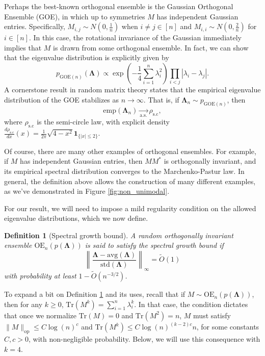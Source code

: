 \documentclass[reqno]{amsart}
\numberwithin{equation}{section}
\newcommand\on[1]{{\mathbf 1}_{\{#1\}}}
\newcommand{\emp}{\mathrm{emp}}
\newtheorem{definition}[theorem]{Definition}
\begin{document}
Perhaps the best-known orthogonal ensemble is the Gaussian Orthogonal Ensemble (GOE), in which up to symmetries $M$ has independent Gaussian entries. Specifically, $M_{i,j} \sim N(0,\frac{1}{n})$ when $i\neq j \in [n]$ and $M_{i,i} \sim N(0, \frac{2}{n})$ for $i \in [n]$. In this case, the rotational invariance of the Gaussian immediately implies that $M$ is drawn from some orthogonal ensemble. In fact, we can show that the eigenvalue distribution is explicitly given by
\begin{equation} \label{eq:GOEeigs}
    p_{\mathrm{GOE}(n)}(\bm{\Lambda}) \propto \exp\left(-\frac{1}{4}\sum\limits_{i=1}^n\lambda_i^2\right) \prod_{i<j} |\lambda_i-\lambda_j|.
\end{equation}
A cornerstone result in random matrix theory states that the empirical eigenvalue distribution of the GOE stabilizes as $n\to \infty$. That is, if $\bm{\Lambda}_n\sim  p_{\mathrm{GOE}(n)}$,
then 
\begin{equation} \label{eq:wigner}
    \emp(\bm{\Lambda}_n) \underset{\mathrm{a.s.}}{\longrightarrow} \rho_{\mathrm{s.c}},
\end{equation}
where $\rho_{\mathrm{s.c}}$ is the semi-circle law, with explicit density
$\frac{d\rho_{\mathrm{s.c}}}{dx}(x) = \frac{1}{2\pi}\sqrt{4-x^2}\on{|x|\leq 2}.$ 

Of course, there are many other examples of orthogonal ensembles. For example, if $M$ has independent Gaussian entries, then $MM^*$ is orthogonally invariant, and its empirical spectral distribution converges to the Marchenko-Pastur law. In general, the definition above allows the construction of many different examples, as we've demonstrated in Figure \ref{fig:non_unimodal}.

For our result, we will need to impose a mild regularity condition on the allowed eigenvalue distributions, which we now define.
\begin{definition}[Spectral growth bound]\label{spec_growth}
A random orthogonally invariant ensemble $\mathrm{OE}_n(p(\bm{\Lambda}))$ is said to satisfy the spectral growth bound if 
\[\left\| \frac{\bm{\Lambda} - \mathrm{avg}(\bm{\Lambda})}{\mathrm{std}(\bm{\Lambda})} \right\|_{\infty} = \tilde O(1)%
\]
with probability at least $1 - \tilde O\left({n^{-3/2}}\right)$.
\end{definition}
To expand a bit on Definition \ref{spec_growth} and its uses, recall that if $M \sim \mathrm{OE}_n(p(\bm{\Lambda}))$, then for any $k \geq 0$, $\mathrm{Tr}(M^k) = \sum\limits_{i=1}^n\lambda_i^k$. In that case, the condition dictates that once we normalize $\mathrm{Tr}(M) = 0$ and $\mathrm{Tr}(M^2) = n$, $M$ must satisfy 
$\|M\|_{\mathrm{op}} \leq C\log(n)^c$ and $\mathrm{Tr}(M^k) \leq C\log(n)^{(k-2)c}n$, for some constants $C,c>0$, with non-negligible probability. Below, we will use this consequence with $k=4$.
\end{document}
